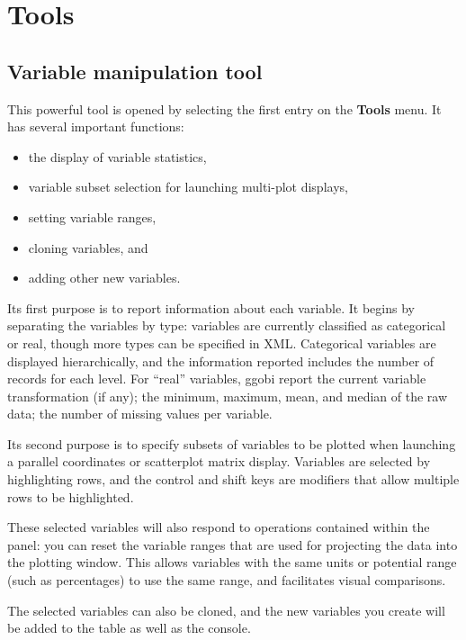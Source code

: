 \documentclass[11pt]{article}
\def\Widget#1{\textbf{#1}}
\begin{document}
\newpage
\section{Tools}
\label{Tools}

\subsection{Variable manipulation tool}
\label{slbl:VarManip}

This powerful tool is opened by selecting the first entry on the
\Widget{Tools} menu.  It has several important functions:
\begin{itemize} \itemsep 0em
\item the display of variable statistics,
\item variable subset selection for launching multi-plot displays,
\item setting variable ranges,
\item cloning variables, and
\item adding other new variables.
\end{itemize}

Its first purpose is to report information about each variable.
It begins by separating the variables by type: variables are
currently classified as categorical or real, though more types
can be specified in XML.  Categorical variables are displayed
hierarchically, and the information reported includes the number
of records for each level.  For ``real'' variables, ggobi report
the current variable transformation (if any); the minimum,
maximum, mean, and median of the raw data; the number of missing values
per variable.

Its second purpose is to specify subsets of variables to be plotted
when launching a parallel coordinates or scatterplot matrix display.
Variables are selected by highlighting rows, and the control and shift
keys are modifiers that allow multiple rows to be highlighted.

These selected variables will also respond to operations contained
within the panel:  you can reset the variable ranges that are used
for projecting the data into the plotting window.  This allows
variables with the same units or potential range (such as percentages)
to use the same range, and facilitates visual comparisons.

The selected variables can also be cloned, and the new variables
you create will be added to the table as well as the console.
\end{document}
